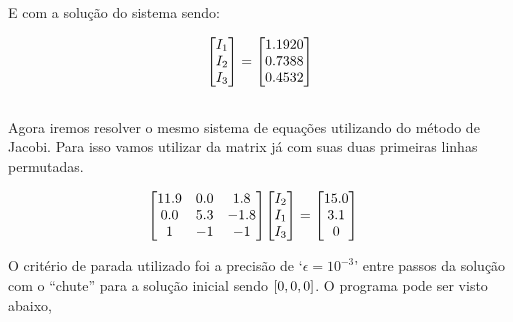\documentclass[twoside]{amsart}
\numberwithin{equation}{section}
\begin{document}
E com a solução do sistema sendo:

\begin{align}
    \mqty[I_1\\I_2\\I_3]=\mqty[1.1920\\ 0.7388\\ 0.4532]
\end{align}

\subsection{}

Agora iremos resolver o mesmo sistema de equações utilizando do método de Jacobi. Para isso vamos utilizar da matrix 
já com suas duas primeiras linhas permutadas. 

\begin{align}
    \mqty[ 11.9 & 0.0 & 1.8 \\ 0.0 & 5.3 & -1.8\\1 & -1 & -1]\mqty[ I_2\\I_1\\ I_3]&=\mqty[15.0\\3.1\\0]
\end{align}

O critério de parada utilizado foi a precisão de `$\epsilon=10^{-3}$' entre passos da solução com 
o ``chute'' para a solução inicial sendo $\qty[0,0,0]$. O programa pode ser visto 
abaixo,
\end{document}
